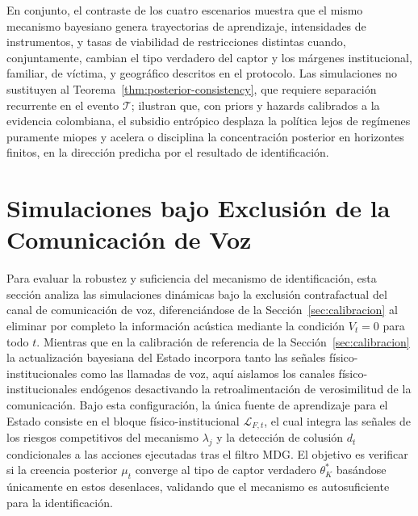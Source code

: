 \documentclass[pdflatex,sn-mathphys-ay]{sn-jnl}
\theoremstyle{thmstyleone}
\theoremstyle{thmstyletwo}
\theoremstyle{thmstylethree}
\newcommand{\1}{\mathbf{1}}
\begin{document}
En conjunto, el contraste de los cuatro escenarios muestra que el mismo mecanismo bayesiano genera trayectorias de aprendizaje, intensidades de instrumentos, y tasas de viabilidad de restricciones distintas cuando, conjuntamente, cambian el tipo verdadero del captor y los márgenes institucional, familiar, de víctima, y geográfico descritos en el protocolo. Las simulaciones no sustituyen al Teorema~\ref{thm:posterior-consistency}, que requiere separación recurrente en el evento $\mathcal{T}$; ilustran que, con priors y hazards calibrados a la evidencia colombiana, el subsidio entrópico desplaza la política lejos de regímenes puramente miopes y acelera o disciplina la concentración posterior en horizontes finitos, en la dirección predicha por el resultado de identificación.

\section{Simulaciones bajo Exclusión de la Comunicación de Voz}\label{sec:no-voice}

Para evaluar la robustez y suficiencia del mecanismo de identificación, esta sección analiza las simulaciones dinámicas bajo la exclusión contrafactual del canal de comunicación de voz, diferenciándose de la Sección~\ref{sec:calibracion} al eliminar por completo la información acústica mediante la condición $V_t = 0$ para todo $t$. Mientras que en la calibración de referencia de la Sección~\ref{sec:calibracion} la actualización bayesiana del Estado incorpora tanto las señales físico-institucionales como las llamadas de voz, aquí aislamos los canales físico-institucionales endógenos desactivando la retroalimentación de verosimilitud de la comunicación. Bajo esta configuración, la única fuente de aprendizaje para el Estado consiste en el bloque físico-institucional $\mathcal{L}_{F,t}$, el cual integra las señales de los riesgos competitivos del mecanismo $\lambda_j$ y la detección de colusión $d_t$ condicionales a las acciones ejecutadas tras el filtro MDG. El objetivo es verificar si la creencia posterior $\mu_t$ converge al tipo de captor verdadero $\theta_K^\ast$ basándose únicamente en estos desenlaces, validando que el mecanismo es autosuficiente para la identificación.
\end{document}
